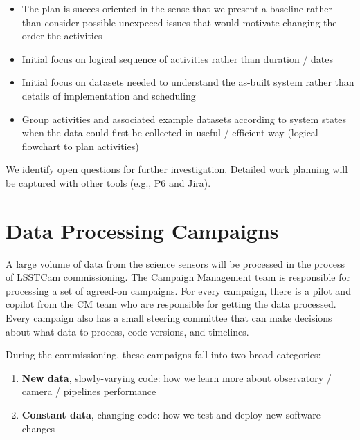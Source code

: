 \documentclass[SE,authoryear,toc,lsstdraft]{lsstdoc}
\begin{document}
\begin{itemize}

  \item The plan is succes-oriented in the sense that we present a baseline rather than consider possible unexpeced issues that would motivate changing the order the activities

  \item Initial focus on logical sequence of activities rather than duration / dates

  \item Initial focus on datasets needed to understand the as-built system rather than details of implementation and scheduling

  \item Group activities and associated example datasets according to system states when the data could first be collected in  useful / efficient way (logical flowchart to plan activities)

\end{itemize}

We identify open questions for further investigation.
Detailed work planning will be captured with other tools (e.g., P6 and Jira).


\section{Data Processing Campaigns}

A large volume of data from the science sensors will be processed in the process of LSSTCam commissioning.
The Campaign Management team is responsible for processing a set of agreed-on campaigns.
For every campaign, there is a pilot and copilot from the CM team who are responsible for getting the data processed.
Every campaign also has a small steering committee that can make decisions about what data to process, code versions, and timelines.

During the commissioning, these campaigns fall into two broad categories:

\begin{enumerate}

  \item \textbf{New data}, slowly-varying code: how we learn more about observatory / camera / pipelines performance

  \item \textbf{Constant data}, changing code: how we test and deploy new software changes

\end{enumerate}
\end{document}
